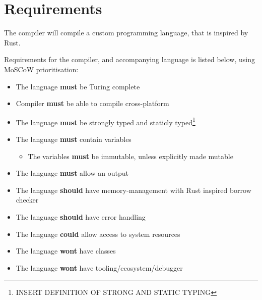 \newpage
\section{Requirements}

The compiler will compile a custom programming language, that is inspired by Rust.

Requirements for the compiler, and accompanying language is listed below, using MoSCoW prioritisation:

\begin{itemize}
\item The language \textbf{must} be Turing complete 
\item Compiler \textbf{must} be able to compile cross-platform
\item The language \textbf{must} be strongly typed and staticly typed\footnote{INSERT DEFINITION OF STRONG AND STATIC TYPING}
\item The language \textbf{must} contain variables
\begin{itemize}
\item The variables \textbf{must} be immutable, unless explicitly made mutable
\end{itemize}
\item The language \textbf{must} allow an output
\item The language \textbf{should} have memory-management with Rust inspired borrow checker
\item The language \textbf{should} have error handling
\item The language \textbf{could} allow access to system resources
\item The language \textbf{wont} have classes
\item The language \textbf{wont} have tooling/ecosystem/debugger
\end{itemize}
